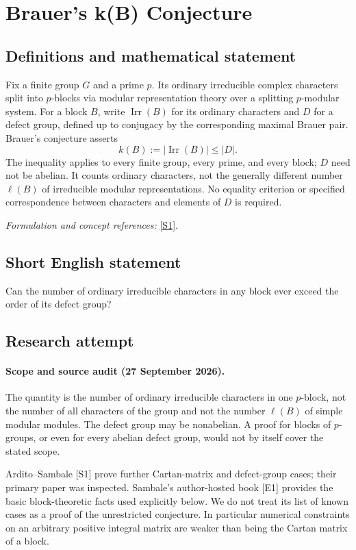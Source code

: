 \documentclass[11pt]{article}
\begin{document}
\section*{\texorpdfstring{Brauer's k(B) Conjecture}{Brauer's k(B) Conjecture}}\label{statement}
\subsection{Definitions and mathematical statement}
Fix a finite group $G$ and a prime $p$. Its ordinary irreducible complex characters split into $p$-blocks via modular representation theory over a splitting $p$-modular system. For a block $B$, write $\operatorname{Irr}(B)$ for its ordinary characters and $D$ for a defect group, defined up to conjugacy by the corresponding maximal Brauer pair. Brauer's conjecture asserts
\[
 k(B):=|\operatorname{Irr}(B)|\le |D|.
\]
The inequality applies to every finite group, every prime, and every block; $D$ need not be abelian. It counts ordinary characters, not the generally different number $\ell(B)$ of irreducible modular representations. No equality criterion or specified correspondence between characters and elements of $D$ is required.
\par\smallskip\textit{Formulation and concept references:} \href{https://arxiv.org/pdf/1911.10710}{[S1]}.

\subsection{Short English statement}
Can the number of ordinary irreducible characters in any block ever exceed the order of its defect group?
\subsection{Research attempt}
\paragraph{Scope and source audit (27 September 2026).}
The quantity is the number of ordinary irreducible characters in one
$p$-block, not the number of all characters of the group and not the
number $\ell(B)$ of simple modular modules. The defect group may be
nonabelian. A proof for blocks of $p$-groups, or even for every abelian
defect group, would not by itself cover the stated scope.

Ardito--Sambale [S1] prove further Cartan-matrix and defect-group cases;
their primary paper was inspected. Sambale's author-hosted book [E1]
provides the basic block-theoretic facts used explicitly below. We do
not treat its list of known cases as a proof of the unrestricted
conjecture. In particular numerical constraints on an arbitrary positive
integral matrix are weaker than being the Cartan matrix of a block.
\end{document}
